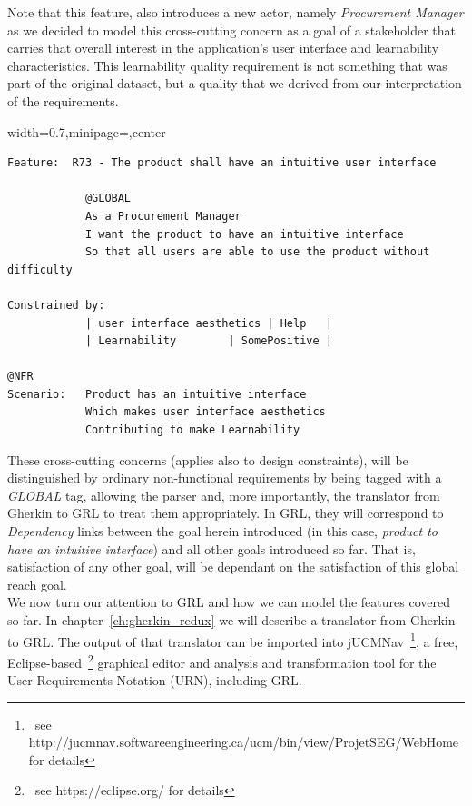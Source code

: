 \documentclass[dissertation,final]{softeng}
\newcommand{\nfrs}{non-functional requirements\xspace}
\newenvironment{featurecode}[1]
{ \lrbox\featurebox \begin{adjustbox}{width=#1\textwidth,minipage=\textwidth,center} }
{ \end{adjustbox}\endlrbox}
\newenvironment{featurelist}[2]
{
\newcommand{\setcaption}{\caption{#1}}
\newcommand{\setlabel}{\label{#2}}
}
{\begin{listing}[h!]\centering\usebox\featurebox\setcaption\setlabel\end{listing}}
\begin{document}
Note that this feature, also introduces a new actor, namely \emph{Procurement Manager} as we decided to model this cross-cutting concern as a goal of a stakeholder that carries that overall interest in the application's user interface and learnability characteristics. This learnability quality requirement is not something that was part of the original dataset, but a quality that we derived from our interpretation of the requirements.

\begin{featurelist}{R73 -- The product shall have an intuitive user interface}{lst:feature_r73}
\begin{featurecode}{0.7}
\begin{verbatim}
Feature:  R73 - The product shall have an intuitive user interface
			
            @GLOBAL
            As a Procurement Manager
            I want the product to have an intuitive interface
            So that all users are able to use the product without difficulty
	
Constrained by:
            | user interface aesthetics | Help	 |
            | Learnability	      | SomePositive |
		
@NFR		
Scenario:   Product has an intuitive interface
            Which makes user interface aesthetics
            Contributing to make Learnability
\end{verbatim}
\end{featurecode}
\end{featurelist}

These cross-cutting concerns (applies also to design constraints), will be distinguished by ordinary \nfrs by being tagged with a \emph{GLOBAL} tag, allowing the parser and, more importantly, the translator from Gherkin to GRL to treat them appropriately. In GRL, they will correspond to \emph{Dependency} links between the goal herein introduced (in this case, \emph{product to have an intuitive interface}) and all other goals introduced so far. That is, satisfaction of any other goal, will be dependant on the satisfaction of this global reach goal.\\

We now turn our attention to GRL and how we can model the features covered so far. In chapter~\ref{ch:gherkin_redux} we will describe a translator from Gherkin to GRL. The output of that translator can be imported into jUCMNav~\footnote{~see http://jucmnav.softwareengineering.ca/ucm/bin/view/ProjetSEG/WebHome for details}, a free, Eclipse-based~\footnote{~see https://eclipse.org/ for details} graphical editor and analysis and transformation tool for the User Requirements Notation (URN), including GRL.
\end{document}

